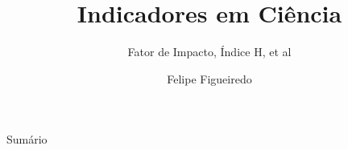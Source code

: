 \documentclass{beamer}
\title%
{Indicadores em Ciência}
\subtitle
{Fator de Impacto, Índice H, et al} %
\author%
{Felipe Figueiredo}%
\institute[] %
{
}
\date%
{}
\begin{document}
\begin{frame}
  \titlepage
\end{frame}

\begin{frame}{Sumário}
  \tableofcontents
\end{frame}







\end{document}
